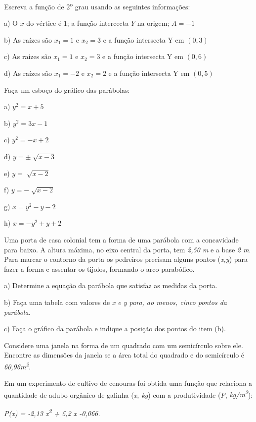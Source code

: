\begin{enumerate}[label=\thechapter.\arabic*]
\exitem{} Escreva a função de 2\textsuperscript{o} grau usando as seguintes informações:

a) O $x$ do vértice é $1$; a função intercecta $Y$ na origem; $A = -1$

b) As raízes são $x_1 = 1$ e $x_2 = 3$ e a função intersecta Y em $(0,3)$

c) As raízes são $x_1 = 1$ e $x_2 = 3$ e a função intersecta Y em $(0,6)$

d) As raízes são $x_1 = -2$ e $x_2 = 2$ e a função intersecta Y em $(0,5)$

\exitem{} Faça um esboço do gráfico das parábolas:

\begin{multicols}{4}
a) $y^2 = x + 5$

b) $y^2 = 3x - 1$

c) $y^2 = -x + 2$

d) \( y= \pm \sqrt[]{x-3} \)

e) \( y=\sqrt[]{x-2} \)

f) \( y=-\sqrt[]{x-2} \)

g) $x = y^2 - y - 2$

h) $x = -y^2 + y + 2$
\end{multicols}

\exitem{} Uma porta de casa colonial tem a forma de uma parábola com a concavidade para baixo. A altura máxima, no eixo central da porta, tem \textit{2,50 m} e a base \textit{2 m}. Para marcar o contorno da porta os pedreiros precisam alguns pontos (\textit{x,y}) para fazer a forma e assentar os tijolos, formando o arco parabólico. 

a) Determine a equação da parábola que satisfaz as medidas da porta.

b) Faça uma tabela com valores de \textit{x e y para, ao menos, cinco pontos da parábola.}

c) Faça o gráfico da parábola e indique a posição dos pontos do item (b).

\exitem{} Considere uma janela na forma de um quadrado com um semicírculo sobre ele. Encontre as dimensões da janela se a área total do quadrado e do semicírculo é  \textit{60,96m\textsuperscript{2}}.

\exitem{} Em um experimento de cultivo de cenouras foi obtida uma função que relaciona a quantidade de adubo orgânico de galinha (\textit{x, kg}) com a produtividade (\textit{P}, \textit{kg/m\textsuperscript{2}}):

\textit{P(x) = -2,13 x\textsuperscript{2} + 5,2 x -0,066.}


\end{enumerate}
